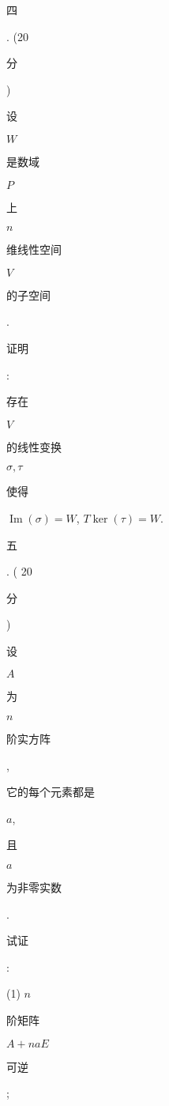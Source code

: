 \documentclass[10pt]{article}
\begin{document}
\begin{CJK}{UTF8}{mj}四\end{CJK}. (20 \begin{CJK}{UTF8}{mj}分\end{CJK}) \begin{CJK}{UTF8}{mj}设\end{CJK} $W$ \begin{CJK}{UTF8}{mj}是数域\end{CJK} $P$ \begin{CJK}{UTF8}{mj}上\end{CJK} $n$ \begin{CJK}{UTF8}{mj}维线性空间\end{CJK} $V$ \begin{CJK}{UTF8}{mj}的子空间\end{CJK}. \begin{CJK}{UTF8}{mj}证明\end{CJK}: \begin{CJK}{UTF8}{mj}存在\end{CJK} $V$ \begin{CJK}{UTF8}{mj}的线性变换\end{CJK} $\sigma, \tau$ \begin{CJK}{UTF8}{mj}使得\end{CJK} $\operatorname{Im}(\sigma)=W$, $T \operatorname{ker}(\tau)=W$.

\begin{CJK}{UTF8}{mj}五\end{CJK}. ( 20 \begin{CJK}{UTF8}{mj}分\end{CJK}) \begin{CJK}{UTF8}{mj}设\end{CJK} $A$ \begin{CJK}{UTF8}{mj}为\end{CJK} $n$ \begin{CJK}{UTF8}{mj}阶实方阵\end{CJK}, \begin{CJK}{UTF8}{mj}它的每个元素都是\end{CJK} $a$, \begin{CJK}{UTF8}{mj}且\end{CJK} $a$ \begin{CJK}{UTF8}{mj}为非零实数\end{CJK}. \begin{CJK}{UTF8}{mj}试证\end{CJK}:

(1) $n$ \begin{CJK}{UTF8}{mj}阶矩阵\end{CJK} $A+n a E$ \begin{CJK}{UTF8}{mj}可逆\end{CJK};
\end{document}
